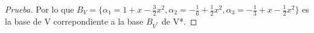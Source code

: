 \documentclass[12pt]{article}
\begin{document}
\begin{proof} [Prueba]
Por lo que $B_{V}=\{\alpha_{1}=1 + x - \frac{3}{2}x^{2}, 
					\alpha_{2}=-\frac{1}{6} + \frac{1}{2}x^{2}, 
					\alpha_{3}=-\frac{1}{3} + x - \frac{1}{2}x^{2}\}$ 
es la base de V correpondiente a la base $B_{V^{*}}$ de V*. 

\end{proof}
\end{document}
